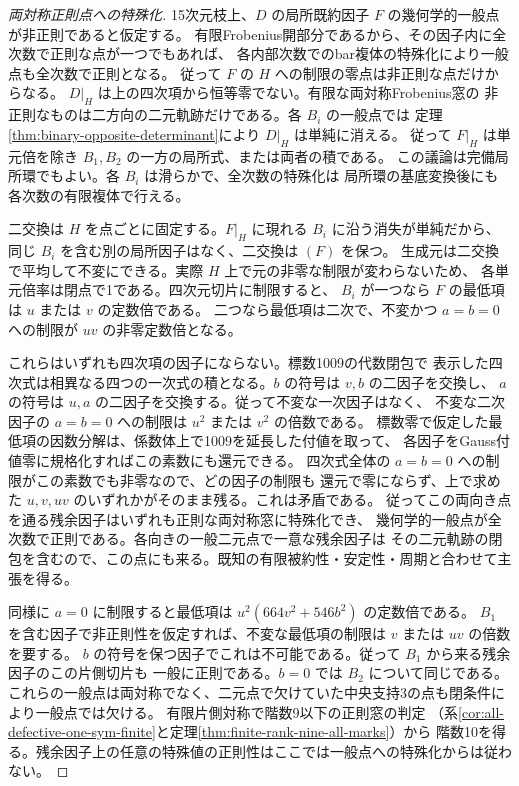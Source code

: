 \begin{proof}[両対称正則点への特殊化]
15次元枝上、$D$ の局所既約因子 $F$ の幾何学的一般点が非正則であると仮定する。
有限Frobenius開部分であるから、その因子内に全次数で正則な点が一つでもあれば、
各内部次数でのbar複体の特殊化により一般点も全次数で正則となる。
従って $F$ の $H$ への制限の零点は非正則な点だけからなる。
$D|_H$ は上の四次項から恒等零でない。有限な両対称Frobenius窓の
非正則なものは二方向の二元軌跡だけである。各 $B_i$ の一般点では
定理\ref{thm:binary-opposite-determinant}により $D|_H$ は単純に消える。
従って $F|_H$ は単元倍を除き $B_1,B_2$ の一方の局所式、または両者の積である。
この議論は完備局所環でもよい。各 $B_i$ は滑らかで、全次数の特殊化は
局所環の基底変換後にも各次数の有限複体で行える。

二交換は $H$ を点ごとに固定する。$F|_H$ に現れる $B_i$ に沿う消失が単純だから、
同じ $B_i$ を含む別の局所因子はなく、二交換は $(F)$ を保つ。
生成元は二交換で平均して不変にできる。実際 $H$ 上で元の非零な制限が変わらないため、
各単元倍率は閉点で1である。四次元切片に制限すると、
$B_i$ が一つなら $F$ の最低項は $u$ または $v$ の定数倍である。
二つなら最低項は二次で、不変かつ $a=b=0$ への制限が $uv$ の非零定数倍となる。

これらはいずれも四次項の因子にならない。標数1009の代数閉包で
表示した四次式は相異なる四つの一次式の積となる。$b$ の符号は $v,b$ の二因子を交換し、
$a$ の符号は $u,a$ の二因子を交換する。従って不変な一次因子はなく、
不変な二次因子の $a=b=0$ への制限は $u^2$ または $v^2$ の倍数である。
標数零で仮定した最低項の因数分解は、係数体上で1009を延長した付値を取って、
各因子をGauss付値零に規格化すればこの素数にも還元できる。
四次式全体の $a=b=0$ への制限がこの素数でも非零なので、どの因子の制限も
還元で零にならず、上で求めた $u,v,uv$ のいずれかがそのまま残る。これは矛盾である。
従ってこの両向き点を通る残余因子はいずれも正則な両対称窓に特殊化でき、
幾何学的一般点が全次数で正則である。各向きの一般二元点で一意な残余因子は
その二元軌跡の閉包を含むので、この点にも来る。既知の有限被約性・安定性・周期と合わせて主張を得る。

同様に $a=0$ に制限すると最低項は $u^2(664v^2+546b^2)$ の定数倍である。
$B_1$ を含む因子で非正則性を仮定すれば、不変な最低項の制限は $v$ または $uv$ の倍数を要する。
$b$ の符号を保つ因子でこれは不可能である。従って $B_1$ から来る残余因子のこの片側切片も
一般に正則である。$b=0$ では $B_2$ について同じである。
これらの一般点は両対称でなく、二元点で欠けていた中央支持3の点も閉条件により一般点では欠ける。
有限片側対称で階数9以下の正則窓の判定
（系\ref{cor:all-defective-one-sym-finite}と定理\ref{thm:finite-rank-nine-all-marks}）から
階数10を得る。残余因子上の任意の特殊値の正則性はここでは一般点への特殊化からは従わない。
\end{proof}
